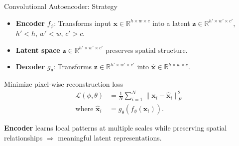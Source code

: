 \documentclass{beamer}
\begin{document}
\begin{frame}{Convolutional Autoencoder: Strategy}
  \begin{itemize}
  \item \textbf{Encoder} $f_\phi$: Transforms input $\mathbf{x}\in \mathbb{R}^{h\times w\times c}$ into a latent $\mathbf{z}\in \mathbb{R}^{h'\times w'\times c'}$, $h' < h$, $w' < w$, $c' > c$. 
    \vspace{0.3cm}
  \item \textbf{Latent space} $\mathbf{z} \in \mathbb{R}^{h' \times w' \times c'}$ preserves spatial structure.
    \vspace{0.3cm}
  \item \textbf{Decoder} $g_\theta$: Transforms $\mathbf{z} \in \mathbb{R}^{h' \times w' \times c'}$ into $\hat{\mathbf{x}}\in \mathbb{R}^{h\times w\times c}$. 
  \end{itemize}
  \vspace{0.3cm}
  Minimize pixel-wise reconstruction loss
  \begin{align*}
    \mathcal{L}(\phi, \theta) &= \frac{1}{N} \sum_{i=1}^N \|\mathbf{x}_i - \hat{\mathbf{x}}_i\|_F^2\\
    \text{where } \hat{\mathbf{x}}_i &= g_\theta(f_\phi(\mathbf{x}_i)).
  \end{align*}

  \vspace{0.3cm}\pause
  \alert{\textbf{Encoder}} learns local patterns at multiple scales while preserving spatial relationships $\Rightarrow$ meaningful latent representations.
\end{frame}
\end{document}
